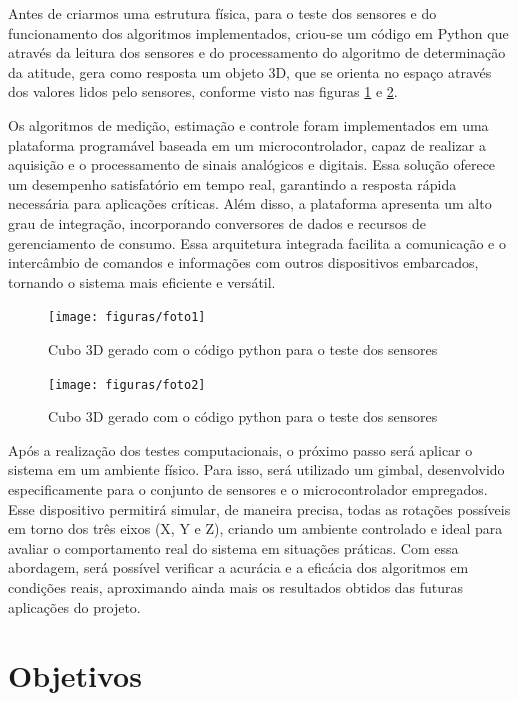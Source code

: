 \documentclass[
	12pt,				%
	openright,			%
	oneside,			%
	a4paper,			%
	english,			%
	brazil				%
	]{abntex2}
\begin{document}
Antes de criarmos uma estrutura física, para o teste dos sensores e do funcionamento dos algoritmos implementados, criou-se um código em Python que através da leitura dos sensores e do processamento do algoritmo de determinação da atitude, gera como resposta um objeto 3D, que se orienta no espaço através dos valores lidos pelo sensores, conforme visto nas figuras \ref{fig:Imagemcubo1} e \ref{fig:Imagemcubo2}.

Os algoritmos de medição, estimação e controle foram implementados em uma plataforma programável baseada em um microcontrolador, capaz de realizar a aquisição e o processamento de sinais analógicos e digitais. Essa solução oferece um desempenho satisfatório em tempo real, garantindo a resposta rápida necessária para aplicações críticas. Além disso, a plataforma apresenta um alto grau de integração, incorporando conversores de dados e recursos de gerenciamento de consumo. Essa arquitetura integrada facilita a comunicação e o intercâmbio de comandos e informações com outros dispositivos embarcados, tornando o sistema mais eficiente e versátil.

\begin{figure}[h]
	\centering
	\texttt{[image: figuras/foto1]}
	\caption{Cubo 3D gerado com o código python para o teste dos sensores}
	\label{fig:Imagemcubo1}
\end{figure}

\begin{figure}[h]
	\centering
	\texttt{[image: figuras/foto2]}
	\caption{Cubo 3D gerado com o código python para o teste dos sensores}
	\label{fig:Imagemcubo2}
\end{figure}


Após a realização dos testes computacionais, o próximo passo será aplicar o sistema em um ambiente físico. Para isso, será utilizado um gimbal, desenvolvido especificamente para o conjunto de sensores e o microcontrolador empregados. Esse dispositivo permitirá simular, de maneira precisa, todas as rotações possíveis em torno dos três eixos (X, Y e Z), criando um ambiente controlado e ideal para avaliar o comportamento real do sistema em situações práticas. Com essa abordagem, será possível verificar a acurácia e a eficácia dos algoritmos em condições reais, aproximando ainda mais os resultados obtidos das futuras aplicações do projeto.


\section{Objetivos}
\end{document}
